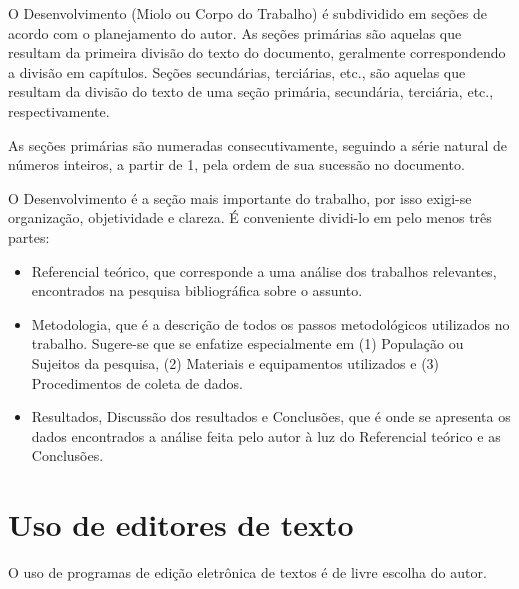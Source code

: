 O Desenvolvimento (Miolo ou Corpo do Trabalho) é subdividido em seções de 
acordo com o planejamento do autor. As seções primárias são aquelas que 
resultam da primeira divisão do texto do documento, geralmente 
correspondendo a divisão em capítulos. Seções secundárias, terciárias, 
etc., são aquelas que resultam da divisão do texto de uma seção primária, 
secundária, terciária, etc., respectivamente.

As seções primárias são numeradas consecutivamente, seguindo a série 
natural de números inteiros, a partir de 1, pela ordem de sua sucessão no 
documento.

O Desenvolvimento é a seção mais importante do trabalho, por isso exigi-se 
organização, objetividade e clareza. É conveniente dividi-lo em pelo menos 
três partes:

\begin{itemize}

	\item Referencial teórico, que corresponde a uma análise dos trabalhos 
	relevantes, encontrados na pesquisa bibliográfica sobre o assunto. 
	\item Metodologia, que é a descrição de todos os passos metodológicos 
	utilizados no trabalho. Sugere-se que se enfatize especialmente em (1) 
	População ou Sujeitos da pesquisa, (2) Materiais e equipamentos 
	utilizados e (3) Procedimentos de coleta de dados.
	\item Resultados, Discussão dos resultados e Conclusões, que é onde se 
	apresenta os dados encontrados a análise feita pelo autor à luz do 
	Referencial teórico e as Conclusões.

\end{itemize}

\section{Uso de editores de texto}

O uso de programas de edição eletrônica de textos é de livre escolha do autor. 

